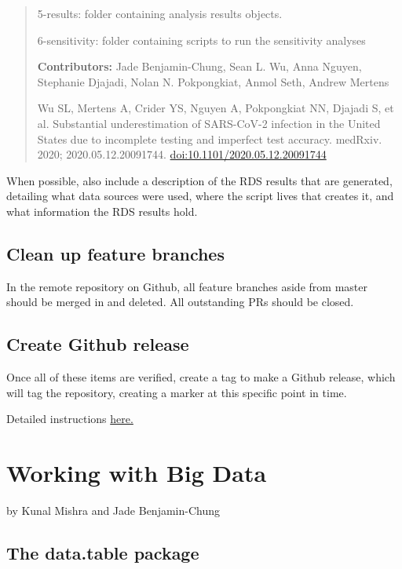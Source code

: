 \documentclass[]{book}
\begin{document}
\begin{quote}
5-results: folder containing analysis results objects.

6-sensitivity: folder containing scripts to run the sensitivity analyses

\textbf{Contributors:} Jade Benjamin-Chung, Sean L. Wu, Anna Nguyen,
Stephanie Djajadi, Nolan N. Pokpongkiat, Anmol Seth, Andrew Mertens

Wu SL, Mertens A, Crider YS, Nguyen A, Pokpongkiat NN, Djajadi S, et al.
Substantial underestimation of SARS-CoV-2 infection in the United States
due to incomplete testing and imperfect test accuracy. medRxiv. 2020;
2020.05.12.20091744. \url{doi:10.1101/2020.05.12.20091744}
\end{quote}

When possible, also include a description of the RDS results that are
generated, detailing what data sources were used, where the script lives
that creates it, and what information the RDS results hold.

\hypertarget{clean-up-feature-branches}{\section{Clean up feature
branches}\label{clean-up-feature-branches}}

In the remote repository on Github, all feature branches aside from
master should be merged in and deleted. All outstanding PRs should be
closed.

\hypertarget{create-github-release}{\section{Create Github
release}\label{create-github-release}}

Once all of these items are verified, create a tag to make a Github
release, which will tag the repository, creating a marker at this
specific point in time.

Detailed instructions
\href{https://docs.github.com/en/enterprise/2.13/user/articles/creating-releases}{here.}

\chapter{Working with Big Data}\label{working-with-big-data}

by Kunal Mishra and Jade Benjamin-Chung

\section{The data.table package}\label{the-data.table-package}
\end{document}
